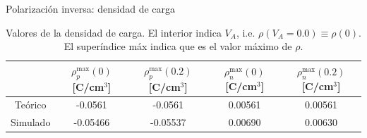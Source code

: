 \documentclass[aspectratio=169,xcolor=dvipsnames]{beamer}
\begin{document}
\begin{frame}{Polarización inversa: densidad de carga}
        \begin{table}
            \caption{Valores de la densidad de carga. El interior indica $V_A$, i.e. $\rho(V_A=0.0)\equiv\rho(0)$. El superíndice máx indica que es el valor máximo de $\rho$.}
            \begin{tabular}{c|cc|cc}
                & $\rho_p^{\max} (0)$ \tiny{[C/cm$^3$]} & $\rho_p^{\max} (0.2)$ \tiny{[C/cm$^{3}$]}  & $\rho_n^{\max} (0)$ \tiny{[C/cm$^{3}$]}  & $\rho_n ^{\max} (0.2)$ \tiny{[C/cm$^{3}$]}  \\ \hline
                Teórico & -0.0561 & -0.0561 & 0.00561 & 0.00561 \\
                Simulado & -0.05466 & -0.05537  & 0.00690 &  0.00630
            \end{tabular}
        \end{table}

\end{frame}
\end{document}
